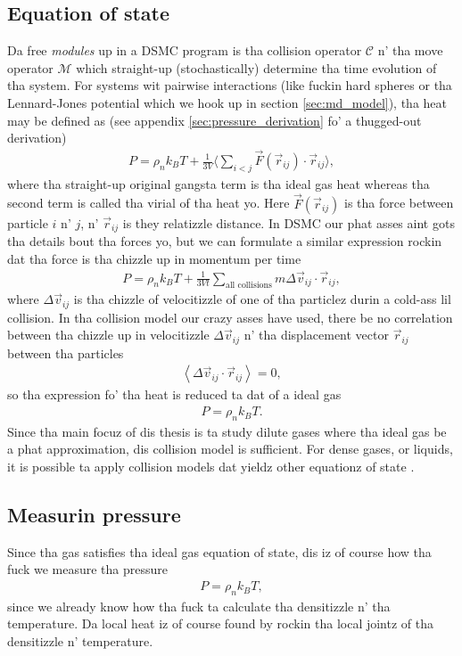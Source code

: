 \subsection{Equation of state}
\label{sec:dsmc_eos}
Da free \textit{modules} up in a DSMC program is tha collision operator $\mathcal C$ n' tha move operator $\mathcal M$ which straight-up (stochastically) determine tha time evolution of tha system. For systems wit pairwise interactions (like fuckin hard spheres or tha Lennard-Jones potential which we hook up in section \ref{sec:md_model}), tha heat may be defined as (see appendix \ref{sec:pressure_derivation} fo' a thugged-out derivation)
\begin{align}
	P = \rho_nk_BT + \frac{1}{3V}\bigg\langle \sum_{i<j} \vec F(\vec r_{ij})\cdot \vec r_{ij}\bigg\rangle,
\end{align}
where tha straight-up original gangsta term is tha ideal gas heat whereas tha second term is called tha virial of tha heat yo. Here $\vec F(\vec r_{ij})$ is tha force between particle $i$ n' $j$, n' $\vec r_{ij}$ is they relatizzle distance. In DSMC our phat asses aint gots tha details bout tha forces yo, but we can formulate a similar expression rockin dat tha force is tha chizzle up in momentum per time
\begin{align}
	P = \rho_nk_BT + \frac{1}{3Vt}\sum_\text{all collisions} m\Delta \vec v_{ij}\cdot \vec r_{ij},
\end{align}
where $\Delta \vec v_{ij}$ is tha chizzle of velocitizzle of one of tha particlez durin a cold-ass lil collision\cite{garcia1997direct}. In tha collision model our crazy asses have used, there be no correlation between tha chizzle up in velocitizzle $\Delta \vec v_{ij}$ n' tha displacement vector $\vec r_{ij}$ between tha particles
\begin{align}
	\left\langle \Delta \vec v_{ij}\cdot \vec r_{ij}\right\rangle = 0,
\end{align}
so tha expression fo' tha heat is reduced ta dat of a ideal gas
\begin{align}
	P = \rho_n k_BT.
\end{align}
Since tha main focuz of dis thesis is ta study dilute gases where tha ideal gas be a phat approximation, dis collision model is sufficient. For dense gases, or liquids, it is possible ta apply collision models dat yieldz other equationz of state \cite{garcia1997direct}.
\subsection{Measurin pressure}
Since tha gas satisfies tha ideal gas equation of state, dis iz of course how tha fuck we measure tha pressure
\begin{align}
	P = \rho_n k_BT,
\end{align}
since we already know how tha fuck ta calculate tha densitizzle n' tha temperature. Da local heat iz of course found by rockin tha local jointz of tha densitizzle n' temperature.
